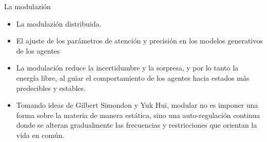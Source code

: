 \documentclass[aspectratio=169,xcolor=dvipsnames]{beamer}
\begin{document}
\begin{frame}{La modulazión}

    \begin{itemize}
        \item La modulazión distribuida. 
        \item El ajuste de los parámetros de atención y precisión en los modelos generativos de los agentes
        \item La modulación reduce la incertidumbre y la sorpresa, y por lo tanto la energía libre, al guiar el comportamiento de los agentes hacia estados más predecibles y estables.
        \item Tomando ideas de Gilbert Simondon y Yuk Hui, modular no es imponer una forma sobre la materia de manera estática, sino una auto-regulación continua donde se alteran gradualmente las frecuencias y restricciones que orientan la vida en común.
    \end{itemize}

\end{frame}
\end{document}

